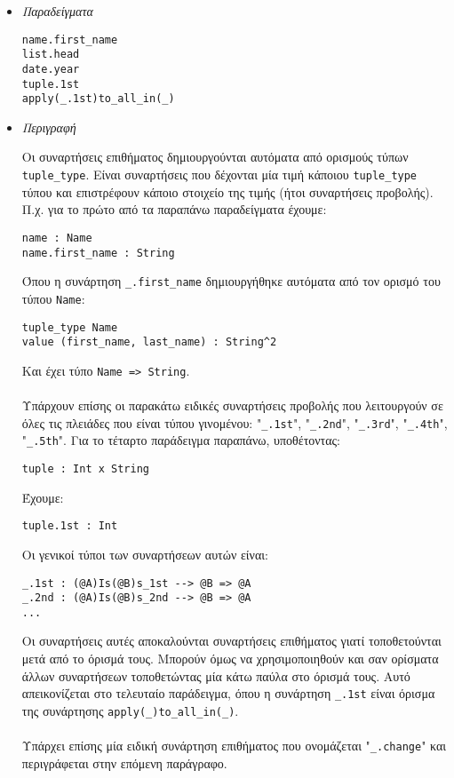 \documentclass[diploma]{softlab-thesis}
\begin{document}
\begin{itemize}

\item \textit{Παραδείγματα}
\begin{verbatim}
name.first_name
list.head
date.year
tuple.1st
apply(_.1st)to_all_in(_)
\end{verbatim}

\item \textit{Περιγραφή}

Οι συναρτήσεις επιθήματος δημιουργούνται αυτόματα από ορισμούς τύπων
\verb|tuple_type|. Είναι συναρτήσεις που δέχονται μία τιμή κάποιου
\verb|tuple_type| τύπου και επιστρέφουν κάποιο στοιχείο της τιμής
(ήτοι συναρτήσεις προβολής).
Π.χ. για το πρώτο από τα παραπάνω παραδείγματα έχουμε:
\begin{verbatim}
name : Name
name.first_name : String
\end{verbatim}
Όπου η συνάρτηση \verb|_.first_name| δημιουργήθηκε αυτόματα από τον ορισμό
του τύπου \verb|Name|:
\begin{verbatim}
tuple_type Name
value (first_name, last_name) : String^2
\end{verbatim}
Και έχει τύπο \verb|Name => String|.
\\\\
Υπάρχουν επίσης οι παρακάτω ειδικές συναρτήσεις προβολής που λειτουργούν σε
όλες τις πλειάδες που είναι τύπου γινομένου:
"\verb|_.1st|", "\verb|_.2nd|", "\verb|_.3rd|", "\verb|_.4th|", "\verb|_.5th|".
Για το τέταρτο παράδειγμα παραπάνω, υποθέτοντας:
\begin{verbatim}
tuple : Int x String
\end{verbatim}
Έχουμε:
\begin{verbatim}
tuple.1st : Int
\end{verbatim}
Οι γενικοί τύποι των συναρτήσεων αυτών είναι:
\begin{verbatim}
_.1st : (@A)Is(@B)s_1st --> @B => @A
_.2nd : (@A)Is(@B)s_2nd --> @B => @A
...
\end{verbatim}
Οι συναρτήσεις αυτές αποκαλούνται συναρτήσεις επιθήματος γιατί τοποθετούνται
μετά από το όρισμά τους. Μπορούν όμως να χρησιμοποιηθούν και σαν ορίσματα άλλων
συναρτήσεων τοποθετώντας μία κάτω παύλα στο όρισμά τους.  Αυτό απεικονίζεται
στο τελευταίο παράδειγμα, όπου η συνάρτηση \verb|_.1st| είναι όρισμα της
συνάρτησης \verb|apply(_)to_all_in(_)|.
\\\\
Υπάρχει επίσης μία ειδική συνάρτηση επιθήματος που ονομάζεται "\verb|_.change|"
και περιγράφεται στην επόμενη παράγραφο.

\end{itemize}
\end{document}
